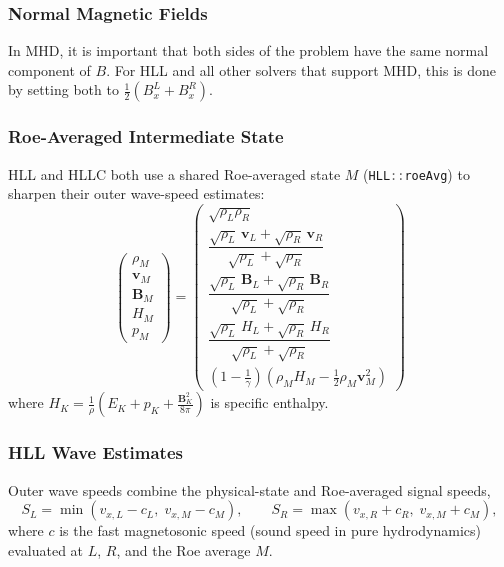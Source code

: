 \documentclass[11pt]{report}
\newcommand{\cpp}[1]{\lstinline[language=C++]{#1}}
\begin{document}
\subsubsection{Normal Magnetic Fields}
In MHD, it is important that both sides of the problem have the same normal component of $B$. For HLL and all other solvers that support MHD, this is done by setting both to $\frac{1}{2}\left(B^L_x+ B^R_x\right)$.


\subsubsection{Roe-Averaged Intermediate State}
\label{sec:roe-avg}

HLL and HLLC both use a shared Roe-averaged state $M$ (\cpp{HLL::roeAvg}) to sharpen their outer wave-speed estimates:
\begin{equation}
\begin{pmatrix}
\rho_M\\[12pt]
\mathbf{v}_M\\[16pt]
\mathbf{B}_M\\[16pt]
H_M\\[12pt]
p_M
\end{pmatrix} = 
\begin{pmatrix}
\sqrt{\rho_L \rho_R}\\[4pt]
\dfrac{\sqrt{\rho_L}\,\mathbf{v}_L + \sqrt{\rho_R}\,\mathbf{v}_R} {\sqrt{\rho_L} + \sqrt{\rho_R}}\\[12pt]
\dfrac{\sqrt{\rho_L}\,\mathbf{B}_L + \sqrt{\rho_R}\,\mathbf{B}_R} {\sqrt{\rho_L} + \sqrt{\rho_R}}\\[12pt]
\dfrac{\sqrt{\rho_L}\,H_L + \sqrt{\rho_R}\,H_R} {\sqrt{\rho_L} + \sqrt{\rho_R}}\\[12pt]
(1 - \frac{1}{\gamma})\left(\rho_MH_M - \tfrac{1}{2}\rho_M\mathbf{v}_M^2\right)
\end{pmatrix}
\end{equation}
where $H_K = \frac{1}{\rho}\left(E_K+p_K+\frac{\mathbf{B}_K^2}{8\pi}\right)$ is specific enthalpy.


\subsubsection{HLL Wave Estimates} \label{sec:HLL_speed}

Outer wave speeds combine the physical-state and Roe-averaged signal speeds,
\begin{equation}
    S_L = \min\left(v_{x,L} - c_L,\; v_{x,M} - c_M\right), \qquad
    S_R = \max\left(v_{x,R} + c_R,\; v_{x,M} + c_M\right),
\end{equation}
where $c$  is the fast magnetosonic speed (sound speed in pure hydrodynamics) evaluated at $L$, $R$, and the Roe average $M$.
\end{document}
